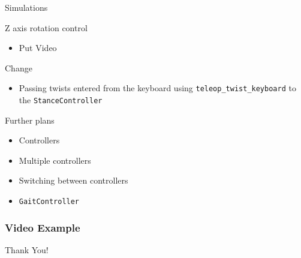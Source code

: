 \documentclass{beamer}
\begin{document}
\begin{frame}{Simulations}

\begin{block}{Z axis rotation control}
    \begin{itemize}
        \item Put Video
    \end{itemize}
\end{block}

\begin{block}{Change}
    \begin{itemize}
        \item Passing twists entered from the keyboard using \texttt{teleop\_twist\_keyboard} to the \texttt{StanceController}
    \end{itemize}
\end{block}

\end{frame}


\begin{frame}{Further plans}

\begin{itemize}
        \item Controllers
        \item Multiple controllers
        \item Switching between controllers
        \item \texttt{GaitController}
\end{itemize}

\end{frame}


\begin{frame}
    \frametitle{Video Example}
\end{frame}

\begin{frame}
	\LARGE{Thank You!}
\end{frame}\normalfont
\end{document}
